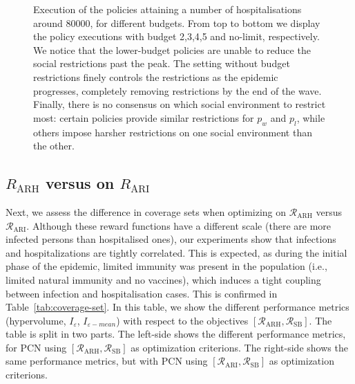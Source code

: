 \documentclass{article}
\newcommand{\mdprewardfn}{\mathcal{R}}
\begin{document}
\begin{figure}
    \centering
    
    \caption{Execution of the policies attaining a number of hospitalisations around $80000$, for different budgets. From top to bottom we display the policy executions with budget 2,3,4,5 and no-limit, respectively. We notice that the lower-budget policies are unable to reduce the social restrictions past the peak. The setting without budget restrictions finely controls the restrictions as the epidemic progresses, completely removing restrictions by the end of the wave. Finally, there is no consensus on which social environment to restrict most: certain policies provide similar restrictions for $p_w$ and $p_l$, while others impose harsher restrictions on one social environment than the other.
    }
    \label{fig:pe-binomial-arh-budgets}
\end{figure}

\subsection{$R_\text{ARH}$ versus on $R_\text{ARI}$}
\label{sec:arh-vs-ari}

Next, we assess the difference in coverage sets when optimizing on $\mdprewardfn_\text{ARH}$ versus $\mdprewardfn_\text{ARI}$. Although these reward functions have a different scale (there are more infected persons than hospitalised ones), our experiments show that infections and hospitalizations are tightly correlated. This is expected, as during the initial phase of the epidemic, limited immunity was present in the population (i.e., limited natural immunity and no vaccines), which induces a tight coupling between infection and hospitalisation cases. This is confirmed in Table~\ref{tab:coverage-set}. In this table, we show the different performance metrics (hypervolume, $I_\varepsilon$, $I_{\varepsilon-mean}$) with respect to the objectives $[\mdprewardfn_\text{ARH}, \mdprewardfn_\text{SB}]$. The table is split in two parts. The left-side shows the different performance metrics, for PCN using $[\mdprewardfn_\text{ARH}, \mdprewardfn_\text{SB}]$ as optimization criterions. The right-side shows the same performance metrics, but with PCN using $[\mdprewardfn_\text{ARI}, \mdprewardfn_\text{SB}]$ as optimization criterions.
\end{document}
